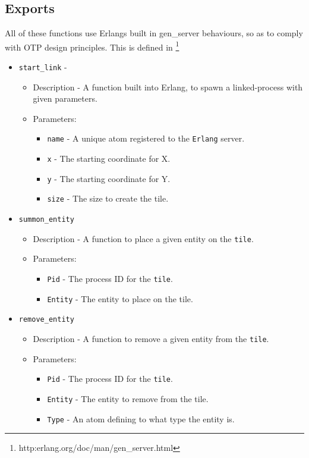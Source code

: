 \subsection{Exports}
All of these functions use Erlangs built in gen\_server behaviours, so as to comply with OTP design principles. This is defined in \footnote{http:erlang.org/doc/man/gen\_server.html}
\begin{itemize}
	\item {\tt start\_link} - 
		\begin{itemize}
			\item Description - A function built into Erlang, to spawn a linked-process with given parameters.
			\item Parameters:
				\begin{itemize}
					\item {\tt name} - A unique atom registered to the \verb+Erlang+ server.
					\item {\tt x} - The starting coordinate for X.
					\item {\tt y} - The starting coordinate for Y.
					\item {\tt size} - The size to create the tile.
				\end{itemize}
		\end{itemize}

	\item {\tt summon\_entity}
		\begin{itemize}
			\item Description - A function to place a given entity on the \verb+tile+.
			\item Parameters:
				\begin{itemize}
					\item {\tt Pid} - The process ID for the \verb+tile+.
					\item {\tt Entity} - The entity to place on the tile.
				\end{itemize}
		\end{itemize}

	\item {\tt remove\_entity}
		\begin{itemize}
			\item Description - A function to remove a given entity from the \verb+tile+.
			\item Parameters:
				\begin{itemize}
					\item {\tt Pid} - The process ID for the \verb+tile+.
					\item {\tt Entity} - The entity to remove from the tile.
					\item {\tt Type} - An atom defining to what type the entity is.
				\end{itemize}
		\end{itemize}


\end{itemize}
